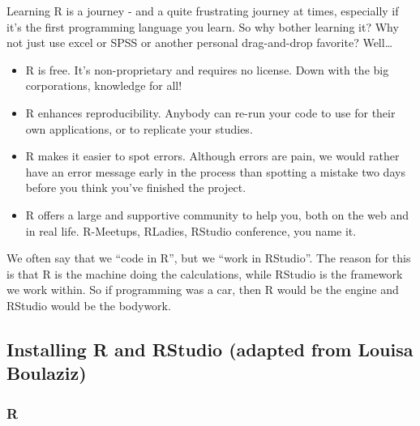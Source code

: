 \documentclass[
]{article}
\providecommand{\tightlist}{%
  \setlength{\itemsep}{0pt}\setlength{\parskip}{0pt}}
\begin{document}
Learning R is a journey - and a quite frustrating journey at times,
especially if it's the first programming language you learn. So why
bother learning it? Why not just use excel or SPSS or another personal
drag-and-drop favorite? Well\ldots{}

\begin{itemize}
\tightlist
\item
  R is free. It's non-proprietary and requires no license. Down with the
  big corporations, knowledge for all!
\item
  R enhances reproducibility. Anybody can re-run your code to use for
  their own applications, or to replicate your studies.
\item
  R makes it easier to spot errors. Although errors are pain, we would
  rather have an error message early in the process than spotting a
  mistake two days before you think you've finished the project.
\item
  R offers a large and supportive community to help you, both on the web
  and in real life. R-Meetups, RLadies, RStudio conference, you name it.
\end{itemize}

We often say that we ``code in R'', but we ``work in RStudio''. The
reason for this is that R is the machine doing the calculations, while
RStudio is the framework we work within. So if programming was a car,
then R would be the engine and RStudio would be the bodywork.

\hypertarget{installing-r-and-rstudio-adapted-from-louisa-boulaziz}{%
\subsection{Installing R and RStudio (adapted from Louisa
Boulaziz)}\label{installing-r-and-rstudio-adapted-from-louisa-boulaziz}}

\hypertarget{r}{%
\subsubsection{R}\label{r}}
\end{document}
